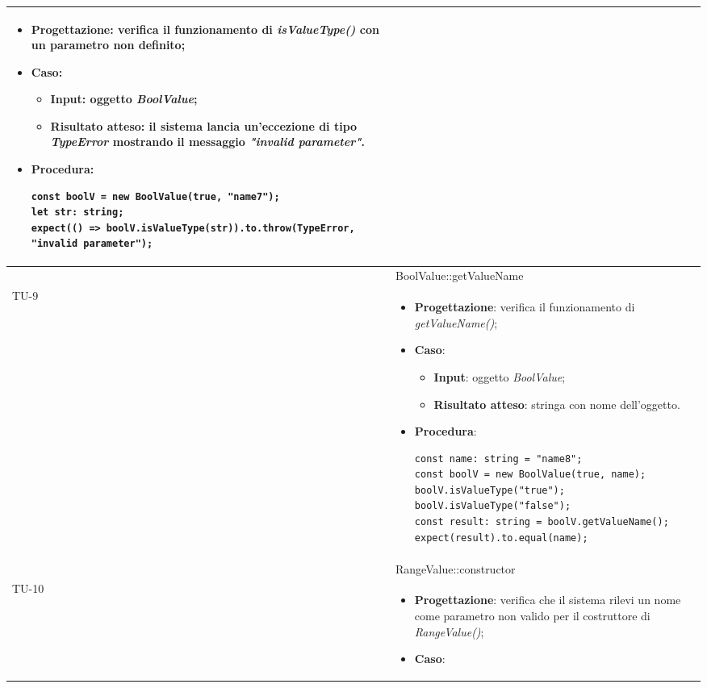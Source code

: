 \begin{longtable}{|C{1.5cm}|C{14.5cm}|}
\begin{itemize}
		\item \textbf{Progettazione}: verifica il funzionamento di \emph{isValueType()} con un parametro non definito;
		\item \textbf{Caso}: 
		\begin{itemize}
			\item \textbf{Input}: oggetto \emph{BoolValue};
			\item \textbf{Risultato atteso}: il sistema lancia un'eccezione di tipo \emph{TypeError} mostrando il messaggio \emph{"invalid parameter"}.
		\end{itemize}
		\item \textbf{Procedura}:
		\begin{lstlisting}
const boolV = new BoolValue(true, "name7");
let str: string;
expect(() => boolV.isValueType(str)).to.throw(TypeError, "invalid parameter");		
		\end{lstlisting}
	\end{itemize}\\
	\hline
	 & BoolValue::getValueName\\
	\hline
	{TU-9} &  
	\begin{itemize}
		\item \textbf{Progettazione}: verifica il funzionamento di \emph{getValueName()};
		\item \textbf{Caso}: 
		\begin{itemize}
			\item \textbf{Input}: oggetto \emph{BoolValue};
			\item \textbf{Risultato atteso}: stringa con nome dell'oggetto.
		\end{itemize}
		\item \textbf{Procedura}:
		\begin{lstlisting}
const name: string = "name8";
const boolV = new BoolValue(true, name);
boolV.isValueType("true");
boolV.isValueType("false");
const result: string = boolV.getValueName();
expect(result).to.equal(name);		
		\end{lstlisting}
	\end{itemize}\\
	\hline
	 & RangeValue::constructor\\
	\hline
	{TU-10} &  
	\begin{itemize}
		\item \textbf{Progettazione}: verifica che il sistema rilevi un nome come parametro non valido per il costruttore di \emph{RangeValue()};
		\item \textbf{Caso}: 

\end{itemize}
\end{longtable}
